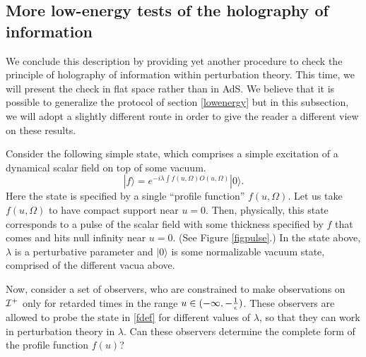 \documentclass[12pt]{article}
\newcommand{\be}{\begin{equation}}
\newcommand{\ee}{\end{equation}}
\def \scrip{{\cal I}^{+}}
\begin{document}
\subsection{More low-energy tests of the holography of information \label{morelowenergy}}
We conclude this description by providing yet another procedure to check the principle of holography of information within perturbation theory. This time, we will present the check in flat space rather than in AdS.  We believe that it is possible to generalize the protocol of section \ref{lowenergy} but in this subsection, we will adopt a slightly different route in order to give the reader a different view on these results.

Consider the following simple state, which comprises a simple excitation of a dynamical scalar field on top of some vacuum.
\be
\label{fdef}
|f \rangle = e^{-i \lambda \int f(u, \Omega) O(u, \Omega)} |0 \rangle.
\ee
Here the state is specified by a single ``profile function'' $f(u, \Omega)$. Let us take $f(u, \Omega)$ to have compact support near $u = 0$. Then, physically, this state corresponds to a pulse of the scalar field with some thickness specified by $f$ that comes and hits null infinity near $u = 0$. (See Figure \ref{figpulse}.) In the state above, $\lambda$ is a perturbative parameter and $|0 \rangle$ is some normalizable vacuum state, comprised of the different vacua above. 

Now, consider a set of observers, who are constrained to make observations on $\scrip$ only for retarded times in the range $u \in (-\infty, -{1 \over \epsilon})$. These observers are allowed to probe the state in \eqref{fdef} for different values of $\lambda$, so that they can work in perturbation theory in $\lambda$. Can these observers determine the complete form of the profile function $f(u)$?  
\end{document}
